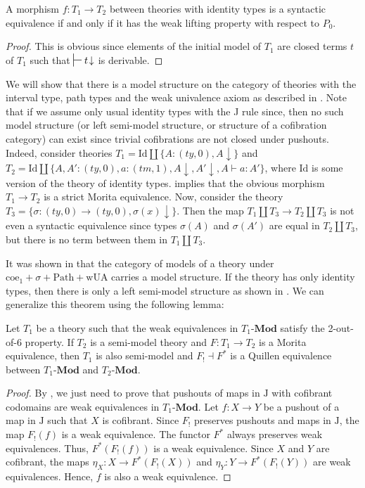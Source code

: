 \documentclass[reqno]{amsart}
\theoremstyle{definition}
\theoremstyle{remark}
\newcommand{\cat}[1]{\mathbf{#1}}
\newcommand{\Mod}[1]{#1\text{-}\cat{Mod}}
\newcommand{\IdT}{\mathrm{Id}}
\newcommand{\wUA}{\mathrm{wUA}}
\newcommand{\coeT}{\mathrm{coe}}
\newcommand{\PathT}{\mathrm{Path}}
\newcommand{\ty}{\mathit{ty}}
\newcommand{\tm}{\mathit{tm}}
\newcommand{\J}{\mathrm{J}}
\numberwithin{figure}{section}
\begin{document}
\begin{prop}
A morphism $f : T_1 \to T_2$ between theories with identity types is a syntactic equivalence if and only if it has the weak lifting property with respect to $P_0$.
\end{prop}
\begin{proof}
This is obvious since elements of the initial model of $T_1$ are closed terms $t$ of $T_1$ such that $\sststile{}{} t\!\downarrow$ is derivable.
\end{proof}

We will show that there is a model structure on the category of theories with the interval type, path types and the weak univalence axiom as described in \cite{alg-models}.
Note that if we assume only usual identity types with the J rule since, then no such model structure (or left semi-model structure, or structure of a cofibration category) can exist since trivial cofibrations are not closed under pushouts.
Indeed, consider theories $T_1 = \IdT \amalg \{ A : (\ty,0), A\!\downarrow \}$ and $T_2 = \IdT \amalg \{ A, A' : (\ty,0), a : (\tm,1), A\!\downarrow, A'\!\downarrow, A \vdash a : A' \}$, where $\IdT$ is some version of the theory of identity types.
 implies that the obvious morphism $T_1 \to T_2$ is a strict Morita equivalence.
Now, consider the theory $T_3 = \{ \sigma : (\ty,0) \to (\ty,0), \sigma(x)\!\downarrow \}$.
Then the map $T_1 \amalg T_3 \to T_2 \amalg T_3$ is not even a syntactic equivalence since types $\sigma(A)$ and $\sigma(A')$ are equal in $T_2 \amalg T_3$, but there is no term between them in $T_1 \amalg T_3$.

It was shown in \cite{alg-models} that the category of models of a theory under $\coeT_1 + \sigma + \PathT + \wUA$ carries a model structure.
If the theory has only identity types, then there is only a left semi-model structure as shown in \cite{kap-lum-model}.
We can generalize this theorem using the following lemma:

\begin{lem}
Let $T_1$ be a theory such that the weak equivalences in $\Mod{T_1}$ satisfy the 2-out-of-6 property.
If $T_2$ is a semi-model theory and $F : T_1 \to T_2$ is a Morita equivalence, then $T_1$ is also semi-model and $F_! \dashv F^*$ is a Quillen equivalence between $\Mod{T_1}$ and $\Mod{T_2}$.
\end{lem}
\begin{proof}
By , we just need to prove that pushouts of maps in $\J$ with cofibrant codomains are weak equivalences in $\Mod{T_1}$.
Let $f : X \to Y$ be a pushout of a map in $\J$ such that $X$ is cofibrant.
Since $F_!$ preserves pushouts and maps in $\J$, the map $F_!(f)$ is a weak equivalence.
The functor $F^*$ always preserves weak equivalences.
Thus, $F^*(F_!(f))$ is a weak equivalence.
Since $X$ and $Y$ are cofibrant, the maps $\eta_X : X \to F^*(F_!(X))$ and $\eta_Y : Y \to F^*(F_!(Y))$ are weak equivalences.
Hence, $f$ is also a weak equivalence.
\end{proof}
\end{document}
